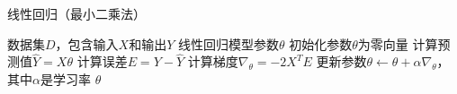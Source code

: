 \documentclass{article}
\begin{document}
	
	\begin{algorithm}
		\caption{线性回归（最小二乘法）}
		\begin{algorithmic}[1]
			\Require 数据集$D$，包含输入$X$和输出$Y$
			\Ensure 线性回归模型参数$\theta$
			\State 初始化参数$\theta$为零向量
			\Repeat
			\State 计算预测值$\hat{Y} = X\theta$
			\State 计算误差$E = Y - \hat{Y}$
			\State 计算梯度$\nabla_{\theta} = -2X^TE$
			\State 更新参数$\theta \leftarrow \theta + \alpha \nabla_{\theta}$，其中$\alpha$是学习率
			\State \Return $\theta$
		\end{algorithmic}
	\end{algorithm}
	
\end{document}
